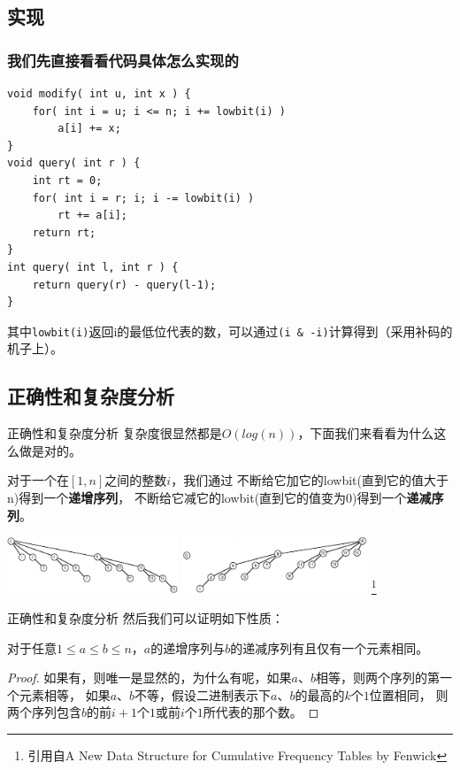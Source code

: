 \documentclass{beamer}
\begin{document}
		\subsection{实现}
			\begin{frame}[fragile=singleslide]
				\frametitle{我们先直接看看代码具体怎么实现的}
				\begin{verbatim}
void modify( int u, int x ) {
    for( int i = u; i <= n; i += lowbit(i) )
        a[i] += x;
}
void query( int r ) {
    int rt = 0;
    for( int i = r; i; i -= lowbit(i) )
        rt += a[i];
    return rt;
}
int query( int l, int r ) {
    return query(r) - query(l-1);
}
				\end{verbatim}
				其中\verb|lowbit(i)|返回i的最低位代表的数，可以通过\verb|(i & -i)|计算得到（采用补码的机子上）。
			\end{frame}
		\subsection{正确性和复杂度分析}
			\begin{frame}{正确性和复杂度分析}
				复杂度很显然都是$O(log(n))$，下面我们来看看为什么这么做是对的。
				\begin{definition}
					对于一个在$[1,n]$之间的整数$i$，我们通过
					不断给它加它的lowbit(直到它的值大于n)得到一个\textbf{递增序列}，
					不断给它减它的lowbit(直到它的值变为0)得到一个\textbf{递减序列}。
				\end{definition}
				\includegraphics[height=1.7cm]{downseq.png}
				\includegraphics[height=1.7cm]{upseq.png}
				\footnote{引用自A New Data Structure for Cumulative Frequency Tables by Fenwick} 
			\end{frame}
			\begin{frame}{正确性和复杂度分析}
				然后我们可以证明如下性质：
				\begin{theorem}
					对于任意$1 \leq a \leq b \leq n$，$a$的递增序列与$b$的递减序列有且仅有一个元素相同。 
				\end{theorem}
				\begin{proof}
					如果有，则唯一是显然的，为什么有呢，如果$a$、$b$相等，则两个序列的第一个元素相等，
					如果$a$、$b$不等，假设二进制表示下$a$、$b$的最高的$k$个$1$位置相同，
					则两个序列包含$b$的前$i+1$个$1$或前$i$个$1$所代表的那个数。
				\end{proof}
			\end{frame}
\end{document}
